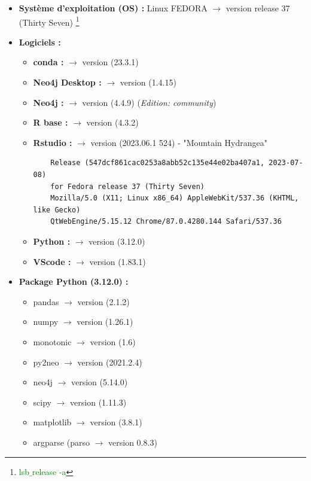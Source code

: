 \documentclass[a4paper,11pt,openright]{report}
\begin{document}
\begin{itemize}
\item \textbf{Système d'exploitation (OS) : } Linux FEDORA $\rightarrow$  version release 37 (Thirty Seven)
\footnote{\textcolor{green}{lsb$\_$release -a}}

\item \textbf{Logiciels : } 
	\begin{itemize}[label=\textbullet]
	\item \textbf{conda : }  $\rightarrow$  version (23.3.1)
	\item \textbf{Neo4j Desktop : }  $\rightarrow$  version (1.4.15)
	\item \textbf{Neo4j : } $\rightarrow$ version (4.4.9) (\textit{Edition: community})
	\item \textbf{R base : }  $\rightarrow$ version (4.3.2)
	\item \textbf{Rstudio : } $\rightarrow$ version (2023.06.1 524) - "Mountain Hydrangea"
	\begin{verbatim}
	Release (547dcf861cac0253a8abb52c135e44e02ba407a1, 2023-07-08) 
	for Fedora release 37 (Thirty Seven) 
	Mozilla/5.0 (X11; Linux x86_64) AppleWebKit/537.36 (KHTML, like Gecko) 
	QtWebEngine/5.15.12 Chrome/87.0.4280.144 Safari/537.36
	\end{verbatim}
	\item \textbf{Python : } $\rightarrow$ version (3.12.0) 
	\item \textbf{VScode : } $\rightarrow$ version (1.83.1)
	\end{itemize}
	
\item \textbf{Package Python (3.12.0) : } 
	\begin{itemize}[label=\textbullet]
	\item pandas  $\rightarrow$  version (2.1.2)
	\item numpy $\rightarrow$ version (1.26.1) 
	\item monotonic $\rightarrow$ version (1.6)
	\item py2neo $\rightarrow$ version (2021.2.4)
	\item neo4j $\rightarrow$ version (5.14.0)
	\item scipy $\rightarrow$ version (1.11.3)
	\item matplotlib $\rightarrow$ version (3.8.1)
	\item argparse (parso $\rightarrow$ version 0.8.3)
	\end{itemize}


\end{itemize}
\end{document}
